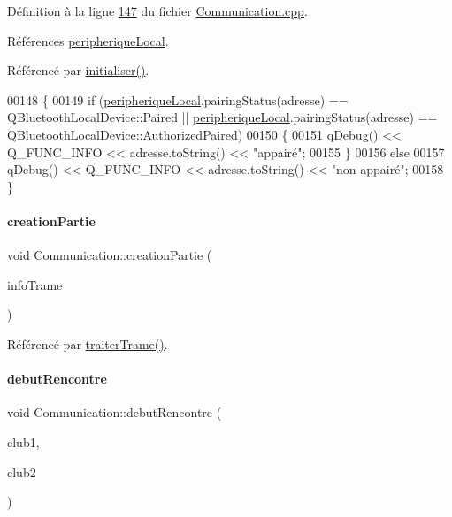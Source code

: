 Définition à la ligne \hyperlink{_communication_8cpp_source_l00147}{147} du fichier \hyperlink{_communication_8cpp_source}{Communication.\+cpp}.



Références \hyperlink{_communication_8h_source_l00053}{peripherique\+Local}.



Référencé par \hyperlink{_communication_8cpp_source_l00044}{initialiser()}.


\begin{DoxyCode}
00148 \{
00149     \textcolor{keywordflow}{if} (\hyperlink{class_communication_a2d643d199169dfe1d258df54d3ee5728}{peripheriqueLocal}.pairingStatus(adresse) == QBluetoothLocalDevice::Paired || 
      \hyperlink{class_communication_a2d643d199169dfe1d258df54d3ee5728}{peripheriqueLocal}.pairingStatus(adresse) == QBluetoothLocalDevice::AuthorizedPaired)
00150     \{
00151         qDebug() << Q\_FUNC\_INFO << adresse.toString() << \textcolor{stringliteral}{"appairé"};
00155     \}
00156     \textcolor{keywordflow}{else}
00157         qDebug() << Q\_FUNC\_INFO << adresse.toString() << \textcolor{stringliteral}{"non appairé"};
00158 \}
\end{DoxyCode}
\mbox{\label{class_communication_a3d8a1dccee9867e6b84932ddc3072b45}} 
\paragraph{\texorpdfstring{creation\+Partie}{creationPartie}}
{\footnotesize\ttfamily void Communication\+::creation\+Partie (\begin{DoxyParamCaption}\item[{Q\+String\+List}]{info\+Trame }\end{DoxyParamCaption})\hspace{0.3cm}{\ttfamily [signal]}}



Référencé par \hyperlink{_communication_8cpp_source_l00208}{traiter\+Trame()}.

\mbox{\label{class_communication_af3430c844d728e4ec3961744243324e1}} 
\paragraph{\texorpdfstring{debut\+Rencontre}{debutRencontre}}
{\footnotesize\ttfamily void Communication\+::debut\+Rencontre (\begin{DoxyParamCaption}\item[{Q\+String}]{club1,  }\item[{Q\+String}]{club2 }\end{DoxyParamCaption})\hspace{0.3cm}{\ttfamily [signal]}}



